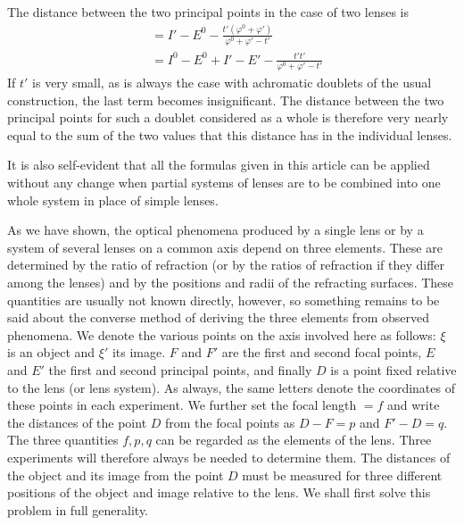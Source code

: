 The distance between the two principal points in the case of two lenses is
\[
\begin{aligned}
&=I'-E^0-\frac{t'(\varphi^0+\varphi')}{\varphi^0+\varphi'-t'}\\
&=I^0-E^0+I'-E'-\frac{t't'}{\varphi^0+\varphi'-t'}
\end{aligned}
\]
If $t'$ is very small, as is always the case with achromatic doublets of the usual construction, the last term becomes insignificant. The distance between the two principal points for such a doublet considered as a whole is therefore very nearly equal to the sum of the two values that this distance has in the individual lenses.

It is also self-evident that all the formulas given in this article can be applied without any change when partial systems of lenses are to be combined into one whole system in place of simple lenses.

As we have shown, the optical phenomena produced by a single lens or by a system of several lenses on a common axis depend on three elements. These are determined by the ratio of refraction (or by the ratios of refraction if they differ among the lenses) and by the positions and radii of the refracting surfaces. These quantities are usually not known directly, however, so something remains to be said about the converse method of deriving the three elements from observed phenomena. We denote the various points on the axis involved here as follows:
$\xi$ is an object and $\xi'$ its image. $F$ and $F'$ are the first and second focal points, $E$ and $E'$ the first and second principal points, and finally $D$ is a point fixed relative to the lens (or lens system). As always, the same letters denote the coordinates of these points in each experiment. We further set the focal length $=f$ and write the distances of the point $D$ from the focal points as $D-F=p$ and $F'-D=q$. The three quantities $f,p,q$ can be regarded as the elements of the lens. Three experiments will therefore always be needed to determine them. The distances of the object and its image from the point $D$ must be measured for three different positions of the object and image relative to the lens. We shall first solve this problem in full generality.

